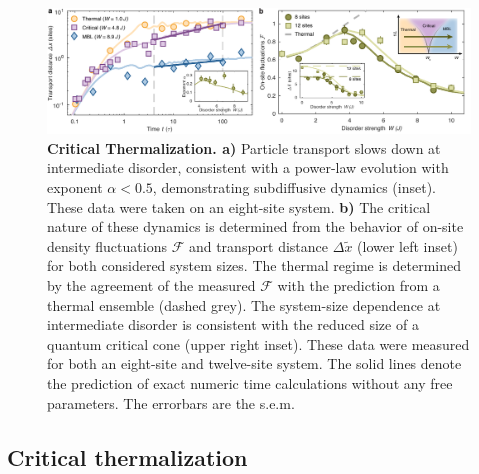 \begin{figure}[t!]
		\includegraphics[width=\columnwidth]{figures/ch6/fig2a.pdf} 
		\caption{\textbf{Critical Thermalization. a)}   Particle transport slows down at intermediate disorder, consistent with a power-law evolution with exponent $\alpha<0.5$, demonstrating subdiffusive dynamics (inset). These data were taken on an eight-site system. \textbf{b)} The critical nature of these dynamics is determined from the behavior of on-site density fluctuations $\mathcal{F}$ and transport distance $\Delta \tilde{x}$ (lower left inset) for both considered system sizes. The thermal regime is determined by the agreement of the measured $\mathcal{F}$ with the prediction from a thermal ensemble (dashed grey). The system-size dependence at intermediate disorder is consistent with the reduced size of a quantum critical cone (upper right inset). These data were measured for both an eight-site and twelve-site system. The solid lines denote the prediction of exact numeric time calculations without any free parameters. The errorbars are the s.e.m.}
		\label{fig:crTherm}	
\end{figure}

\subsection{Critical thermalization}

